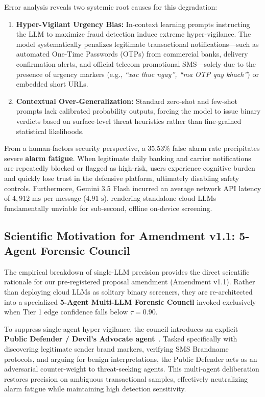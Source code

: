 Error analysis reveals two systemic root causes for this degradation:
\begin{enumerate}
    \item \textbf{Hyper-Vigilant Urgency Bias:} In-context learning prompts instructing the LLM to maximize fraud detection induce extreme hyper-vigilance. The model systematically penalizes legitimate transactional notifications—such as automated One-Time Passwords (OTPs) from commercial banks, delivery confirmation alerts, and official telecom promotional SMS—solely due to the presence of urgency markers (e.g., \textit{``xac thuc ngay'', ``ma OTP quy khach''}) or embedded short URLs.
    \item \textbf{Contextual Over-Generalization:} Standard zero-shot and few-shot prompts lack calibrated probability outputs, forcing the model to issue binary verdicts based on surface-level threat heuristics rather than fine-grained statistical likelihoods.
\end{enumerate}

From a human-factors security perspective, a $35.53\%$ false alarm rate precipitates severe \textbf{alarm fatigue}. When legitimate daily banking and carrier notifications are repeatedly blocked or flagged as high-risk, users experience cognitive burden and quickly lose trust in the defensive platform, ultimately disabling safety controls. Furthermore, Gemini 3.5 Flash incurred an average network API latency of $4,912\text{ ms}$ per message ($4.91\text{ s}$), rendering standalone cloud LLMs fundamentally unviable for sub-second, offline on-device screening.

\subsection{Scientific Motivation for Amendment v1.1: 5-Agent Forensic Council}
The empirical breakdown of single-LLM precision provides the direct scientific rationale for our pre-registered proposal amendment (Amendment v1.1). Rather than deploying cloud LLMs as solitary binary screeners, they are re-architected into a specialized \textbf{5-Agent Multi-LLM Forensic Council} invoked exclusively when Tier 1 edge confidence falls below $\tau = 0.90$.

To suppress single-agent hyper-vigilance, the council introduces an explicit \textbf{Public Defender / Devil's Advocate agent}~\cite{du2024improving, chen2025multiphishguard}. Tasked specifically with discovering legitimate sender brand markers, verifying SMS Brandname protocols, and arguing for benign interpretations, the Public Defender acts as an adversarial counter-weight to threat-seeking agents. This multi-agent deliberation restores precision on ambiguous transactional samples, effectively neutralizing alarm fatigue while maintaining high detection sensitivity.

